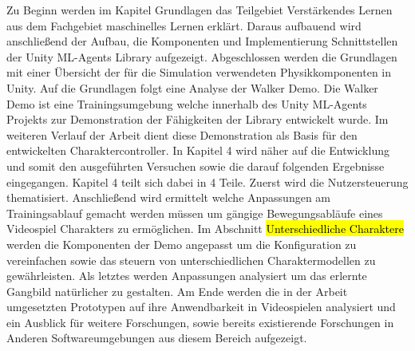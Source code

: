 Zu Beginn werden im Kapitel Grundlagen das Teilgebiet Verstärkendes Lernen aus dem Fachgebiet maschinelles Lernen erklärt. Daraus aufbauend wird anschließend der Aufbau, die Komponenten und Implementierung Schnittstellen der Unity ML-Agents Library aufgezeigt. Abgeschlossen werden die Grundlagen mit einer Übersicht der für die Simulation verwendeten Physikkomponenten in Unity. Auf die Grundlagen folgt eine Analyse der Walker Demo. Die Walker Demo ist eine Trainingsumgebung welche innerhalb des Unity ML-Agents Projekts zur Demonstration der Fähigkeiten der Library entwickelt wurde. Im weiteren Verlauf der Arbeit dient diese Demonstration als Basis für den entwickelten Charaktercontroller. In Kapitel 4 wird näher auf die Entwicklung und somit den ausgeführten Versuchen sowie die darauf folgenden Ergebnisse eingegangen. Kapitel 4 teilt sich dabei in 4 Teile. Zuerst wird die Nutzersteuerung thematisiert. Anschließend wird ermittelt welche Anpassungen am Trainingsablauf gemacht werden müssen um gängige Bewegungsabläufe eines Videospiel Charakters zu ermöglichen.  Im Abschnitt \hl{Unterschiedliche Charaktere} werden die Komponenten der Demo angepasst um die Konfiguration zu vereinfachen sowie das steuern von unterschiedlichen Charaktermodellen zu gewährleisten. Als letztes werden Anpassungen analysiert um das erlernte Gangbild natürlicher zu gestalten. Am Ende werden die in der Arbeit umgesetzten Prototypen auf ihre Anwendbarkeit in Videospielen analysiert und ein Ausblick für weitere Forschungen, sowie bereits existierende Forschungen in Anderen Softwareumgebungen aus diesem Bereich aufgezeigt.